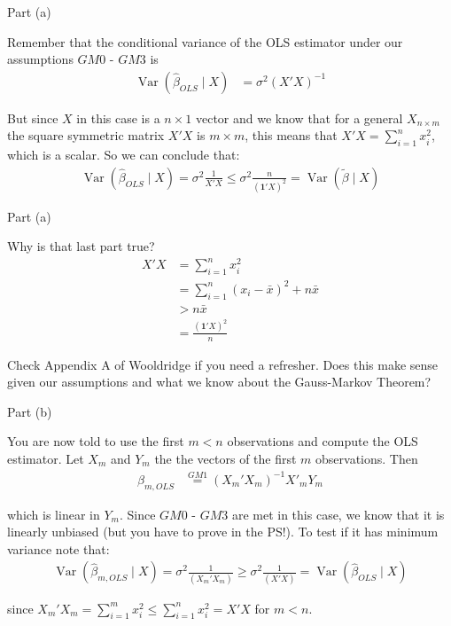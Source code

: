 \begin{frame}{Part (a)}

    Remember that the conditional variance of the OLS estimator under our assumptions $GM0$ - $GM3$ is
    \begin{align*}
        \operatorname{Var} (\hat{\beta}_{OLS} \mid X ) &= \sigma^2 (X'X)^{-1}
    \end{align*}
    
    But since $X$ in this case is a $n \times 1$ vector and we know that for a general $X_{n \times m}$ the square symmetric matrix $X'X$ is $m \times m$, this means that $X'X = \sum_{i=1}^n x_i^2$, which is a scalar. So we can conclude that:
    \begin{align*}
        \operatorname{Var} (\hat{\beta}_{OLS} \mid X ) = \sigma^2 \frac{1}{X'X} \leq \sigma^2 \frac{n}{(\mathbf{1}' X)^2} = \operatorname{Var} (\tilde{\beta} \mid X )
    \end{align*}
    
\end{frame}

\begin{frame}{Part (a)}

    Why is that last part true?
    \begin{align*}
        X'X &= \sum_{i=1}^n x_i^2
        \\
        &= \sum_{i=1}^n (x_i - \bar{x})^2 + n \bar{x}
        \\
        &> n \bar{x}
        \\
        &= \frac{(\mathbf{1}' X)^2}{n}
    \end{align*}

    Check Appendix A of Wooldridge if you need a refresher. Does this make sense given our assumptions and what we know about the Gauss-Markov Theorem?
    
\end{frame}

\begin{frame}{Part (b)}

    You are now told to use the first $m < n$ observations and compute the OLS estimator. Let $X_m$ and $Y_m$ the the vectors of the first $m$ observations. Then
    \begin{align*}
        \hat{\beta}_{m, OLS}  &\overset{GM1}{=} (X_m' X_m)^{-1} X'_m Y_m
    \end{align*}

    which is linear in $Y_m$. Since $GM0$ - $GM3$ are met in this case, we know that it is linearly unbiased (but you have to prove in the PS!). To test if it has minimum variance note that:
    \begin{align*}
        \operatorname{Var} (\hat{\beta}_{m, OLS} \mid X ) = \sigma^2 \frac{1}{(X_m' X_m)} \geq \sigma^2 \frac{1}{(X' X)} = \operatorname{Var} (\hat{\beta}_{OLS} \mid X )
    \end{align*}

    since $X_m' X_m = \sum_{i=1}^m x_i^2 \leq \sum_{i=1}^n x_i^2 = X' X$ for $m < n$.
\end{frame}

